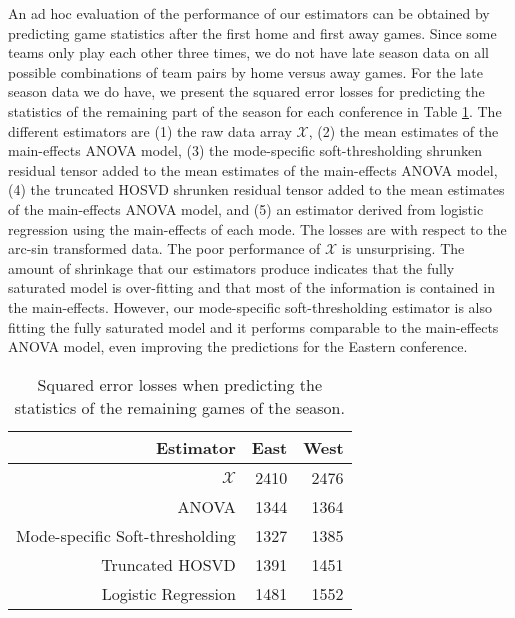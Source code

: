 An ad hoc evaluation of the performance of our estimators can be
obtained by predicting game statistics after the first home and first
away games. Since some teams only play each other three times, we do
not have late season data on all possible combinations of team pairs
by home versus away games. For the late season data we do have, we
present the squared error losses for predicting the statistics of the
remaining part of the season for each conference in Table
\ref{tab:sel.nba}. The different estimators are (1) the raw data array
$\mathcal{X}$, (2) the mean estimates of the main-effects ANOVA model,
(3) the mode-specific soft-thresholding shrunken residual tensor added
to the mean estimates of the main-effects ANOVA model, (4) the
truncated HOSVD shrunken residual tensor added to the mean estimates
of the main-effects ANOVA model, and (5) an estimator derived from
logistic regression using the main-effects of each mode. The losses
are with respect to the arc-sin transformed data. The poor performance
of $\mathcal{X}$ is unsurprising. The amount of shrinkage that our
estimators produce indicates that the fully saturated model is
over-fitting and that most of the information is contained in the
main-effects. However, our mode-specific soft-thresholding estimator
is also fitting the fully saturated model and it performs comparable
to the main-effects ANOVA model, even improving the predictions for
the Eastern conference.


\begin{table}[ht]
  \centering
  \begin{tabular}{rrr}
    Estimator & East & West\\
    \hline
    $\mathcal{X}$ & 2410 & 2476\\
    ANOVA & 1344 & 1364 \\
    Mode-specific Soft-thresholding & 1327 & 1385 \\
    Truncated HOSVD & 1391 & 1451\\
    Logistic Regression & 1481 & 1552\\
  \end{tabular}
  \caption{Squared error losses when predicting the statistics of the remaining games of the season.}
  \label{tab:sel.nba}
\end{table}


